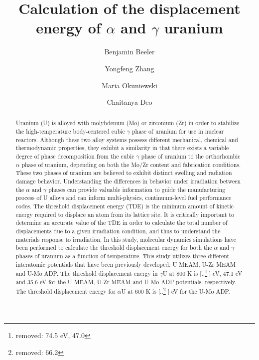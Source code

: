 \documentclass[review]{elsarticle}
\providecommand{\DIFaddtex}[1]{{\protect\color{blue} \sf #1}} %
\providecommand{\DIFdeltex}[1]{{\protect\color{red} [..\footnote{removed: #1} ]}} %
\providecommand{\DIFaddbegin}{} %
\providecommand{\DIFaddend}{} %
\providecommand{\DIFdelbegin}{} %
\providecommand{\DIFdelend}{} %
\providecommand{\DIFadd}[1]{\texorpdfstring{\DIFaddtex{#1}}{#1}} %
\providecommand{\DIFdel}[1]{\texorpdfstring{\DIFdeltex{#1}}{}} %
\newcommand{\DIFscaledelfig}{0.5}
\newlength{\DIFdelgraphicswidth} %
\newlength{\DIFdelgraphicsheight} %
\newcommand{\DIFaddincludegraphics}[2][]{{\color{blue}\fbox{\DIFOincludegraphics[#1]{#2}}}} %
\newcommand{\DIFdelincludegraphics}[2][]{%
\sbox{\DIFdelgraphicsbox}{\DIFOincludegraphics[#1]{#2}}%
\settoboxwidth{\DIFdelgraphicswidth}{\DIFdelgraphicsbox} %
\settoboxtotalheight{\DIFdelgraphicsheight}{\DIFdelgraphicsbox} %
\scalebox{\DIFscaledelfig}{%
\parbox[b]{\DIFdelgraphicswidth}{\usebox{\DIFdelgraphicsbox}\\[-\baselineskip] \rule{\DIFdelgraphicswidth}{0em}}\llap{\resizebox{\DIFdelgraphicswidth}{\DIFdelgraphicsheight}{%
\setlength{\unitlength}{\DIFdelgraphicswidth}%
\begin{picture}(1,1)%
\thicklines\linethickness{2pt} %
{\color[rgb]{1,0,0}\put(0,0){\framebox(1,1){}}}%
{\color[rgb]{1,0,0}\put(0,0){\line( 1,1){1}}}%
{\color[rgb]{1,0,0}\put(0,1){\line(1,-1){1}}}%
\end{picture}%
}\hspace*{3pt}}} %
} %
\DeclareRobustCommand{\DIFaddbegin}{\DIFOaddbegin \let\includegraphics\DIFaddincludegraphics} %
\DeclareRobustCommand{\DIFaddend}{\DIFOaddend \let\includegraphics\DIFOincludegraphics} %
\DeclareRobustCommand{\DIFdelbegin}{\DIFOdelbegin \let\includegraphics\DIFdelincludegraphics} %
\DeclareRobustCommand{\DIFdelend}{\DIFOaddend \let\includegraphics\DIFOincludegraphics} %
\begin{document}
\begin{frontmatter}
\title{Calculation of the displacement energy of $\alpha$ and $\gamma$ uranium}

\author[inl]{Benjamin Beeler}
\author[inl]{Yongfeng Zhang}
\author[pur]{Maria Okuniewski}
\author[gatech]{Chaitanya Deo}
\address[inl]{Idaho National Laboratory, Idaho Falls, ID 83415}
\address[pur]{Purdue University, West Lafayette, IN 47907}
\address[gatech]{Georgia Institute of Technology, Atlanta, GA 30332}

\begin{abstract}

Uranium (U) is alloyed with molybdenum (Mo) or zirconium (Zr) in order to stabilize the high-temperature body-centered cubic $\gamma$ phase of uranium for use in nuclear reactors. Although these two alloy systems possess different mechanical, chemical and thermodynamic properties, they exhibit a similarity in that there exists a variable degree of phase decomposition from the cubic $\gamma$ phase of uranium to the orthorhombic $\alpha$ phase of uranium, depending on both the Mo/Zr content and fabrication conditions. These two phases of uranium are believed to exhibit distinct swelling and radiation damage behavior. Understanding the differences in behavior under irradiation between the $\alpha$ and $\gamma$ phases can provide valuable information to guide the manufacturing process of U alloys and can inform multi-physics, continuum-level fuel performance codes. The threshold displacement energy (TDE) is the minimum amount of kinetic energy required to displace an atom from its lattice site. It is critically important to determine an accurate value of the TDE in order to calculate the total number of displacements due to a given irradiation condition, and thus to understand the materials response to irradiation. In this study, molecular dynamics simulations have been performed to calculate the threshold displacement energy for both the $\alpha$ and $\gamma$ phases of uranium as a function of temperature. This study utilizes three different interatomic potentials that have been previously developed: U MEAM, U-Zr MEAM and U-Mo ADP. The threshold displacement energy in $\gamma$U at 800 K is \DIFdelbegin \DIFdel{74.5 eV, 47.0 }\DIFdelend \DIFaddbegin \DIFadd{73.2 eV, 47.1 }\DIFaddend eV and 35.6 eV for the U MEAM, U-Zr MEAM and U-Mo ADP potentials. respectively. The threshold displacement energy for $\alpha$U at 600 K is \DIFdelbegin \DIFdel{66.2 }\DIFdelend \DIFaddbegin \DIFadd{66.3 }\DIFaddend eV for the U-Mo ADP. 
\end{abstract}
\end{frontmatter}
\end{document}
